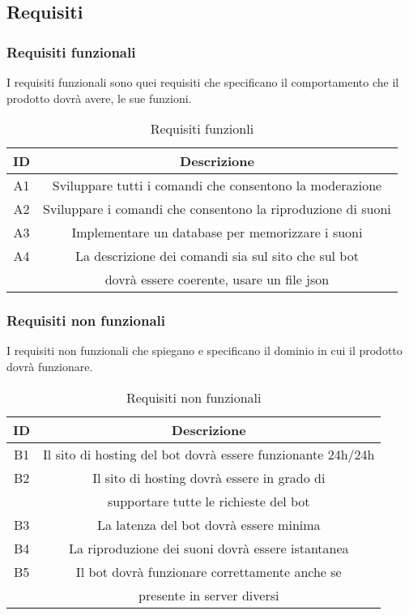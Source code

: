 \newpage
\subsection{Requisiti\label{subsection:req}}

\subsubsection{Requisiti funzionali}
I requisiti funzionali sono quei requisiti che specificano il comportamento che il prodotto dovrà avere, le sue funzioni.
    \begin{table}[h!]
    \begin{center}
    \begin{tabular}{ |c|c| } 
     \hline 
     \textbf{ID} & \textbf{Descrizione}  \\ [0.5ex] 
     \hline\hline
     A1 & Sviluppare tutti i comandi che consentono la moderazione\\
      \hline
     A2 & Sviluppare i comandi che consentono la riproduzione di suoni\\
     \hline
     A3 & Implementare un database per memorizzare i suoni\\
     \hline
     A4 & La descrizione dei comandi sia sul sito che sul bot\\
     & dovrà essere coerente, usare un file json\\
     \hline
    \end{tabular}
    \end{center}
    \caption{Requisiti funzionli}
    \label{req}
    \end{table}
    
\subsubsection{Requisiti non funzionali}
I requisiti non funzionali che spiegano e specificano il dominio in cui il prodotto dovrà funzionare.
    \begin{table}[h!]
    \begin{center}
    \begin{tabular}{ |c|c| } 
     \hline 
     \textbf{ID} & \textbf{Descrizione}  \\ [0.5ex] 
     \hline\hline
     B1 & Il sito di hosting del bot dovrà essere funzionante 24h/24h\\
      \hline
     B2 & Il sito di hosting dovrà essere in grado di\\
     & supportare tutte le richieste del bot\\
     \hline
     B3 & La latenza del bot dovrà essere minima\\
     \hline
     B4 & La riproduzione dei suoni dovrà essere istantanea\\
     \hline
     B5 & Il bot dovrà funzionare correttamente anche se\\
     & presente in server diversi\\
     \hline
    \end{tabular}
    \end{center}
    \caption{Requisiti non funzionali}
    \label{req}
    \end{table}
    
